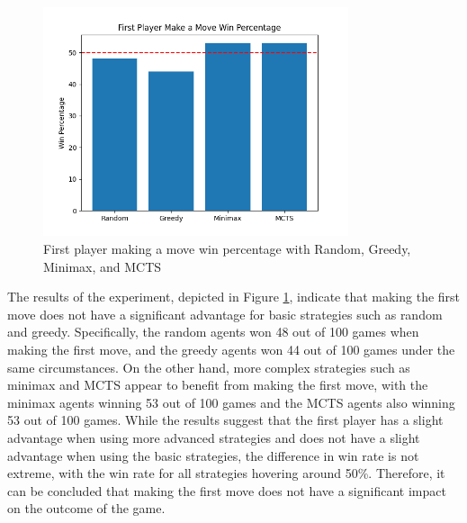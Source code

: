 \begin{figure}[h]
  \centering
  \captionsetup{justification=centering}
  \includegraphics[width=0.8\textwidth]{../img/advantage.png}
  \caption{First player making a move win percentage with Random, Greedy, Minimax, and MCTS}
  \label{firstmoveadvantage}
\end{figure}

The results of the experiment, depicted in Figure \ref{firstmoveadvantage}, indicate that making the first move does not have a significant advantage for basic strategies such as random and greedy. Specifically, the random agents won 48 out of 100 games when making the first move, and the greedy agents won 44 out of 100 games under the same circumstances. On the other hand, more complex strategies such as minimax and MCTS appear to benefit from making the first move, with the minimax agents winning 53 out of 100 games and the MCTS agents also winning 53 out of 100 games. While the results suggest that the first player has a slight advantage when using more advanced strategies and does not have a slight advantage when using the basic strategies, the difference in win rate is not extreme, with the win rate for all strategies hovering around 50\%. Therefore, it can be concluded that making the first move does not have a significant impact on the outcome of the game.